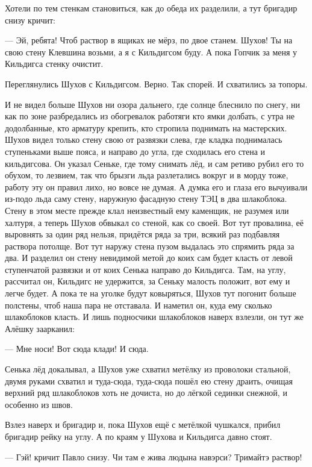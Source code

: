 Хотели по тем стенкам становиться, как до обеда их разделили, а тут бригадир снизу кричит:

--- Эй, ребята! Чтоб раствор в ящиках не мёрз, по двое станем. Шухов! Ты на свою стену Клевшина
возьми, а я с Кильдигсом буду. А пока Гопчик за меня у Кильдигса стенку очистит.

Переглянулись Шухов с Кильдигсом. Верно. Так спорей. И \dash схватились за топоры.

И не видел больше Шухов ни озора дальнего, где солнце блеснило по снегу, ни как по зоне
разбредались из обогревалок работяги \dash кто ямки долбать, с утра не додолбанные, кто
арматуру крепить, кто стропила поднимать на мастерских. Шухов видел только стену свою \dash от
развязки слева, где кладка поднималась ступеньками выше пояса, и направо до угла, где
сходилась его стена и кильдигсова. Он указал Сеньке, где тому снимать лёд, и сам ретиво рубил
его то обухом, то лезвием, так что брызги льда разлетались вокруг и в морду тоже, работу эту
он правил лихо, но вовсе не думая. А думка его и глаза его вычуивали из-подо льда саму стену,
наружную фасадную стену ТЭЦ в два шлакоблока. Стену в этом месте прежде клал неизвестный ему
каменщик, не разумея или халтуря, а теперь Шухов обвыкал со стеной, как со своей. Вот тут \dash
провалина, её выровнять за один ряд нельзя, придётся ряда за три, всякий раз подбавляя
раствора потолще. Вот тут наружу стена пузом выдалась \dash это спрямить ряда за два. И разделил
он стену невидимой метой \dash до коих сам будет класть от левой ступенчатой развязки и от коих
Сенька направо до Кильдигса. Там, на углу, рассчитал он, Кильдигс не удержится, за Сеньку
малость положит, вот ему и легче будет. А пока те на уголке будут ковыряться, Шухов тут
погонит больше полстены, чтоб наша пара не отставала. И наметил он, куда ему сколько
шлакоблоков класть. И лишь подносчики шлакоблоков наверх взлезли, он тут же Алёшку
заарканил:

--- Мне носи! Вот сюда клади! И сюда.

Сенька лёд докалывал, а Шухов уже схватил метёлку из проволоки стальной, двумя руками
схватил и туда-сюда, туда-сюда пошёл ею стену драить, очищая верхний ряд шлакоблоков хоть не
дочиста, но до лёгкой сединки снежной, и особенно из швов.

Взлез наверх и бригадир и, пока Шухов ещё с метёлкой чушкался, прибил бригадир рейку на углу.
А по краям у Шухова и Кильдигса давно стоят.

--- Гэй! \dash кричит Павло снизу. \Dash Чи там е жива людына навэрси? Тримайтэ раствор!

